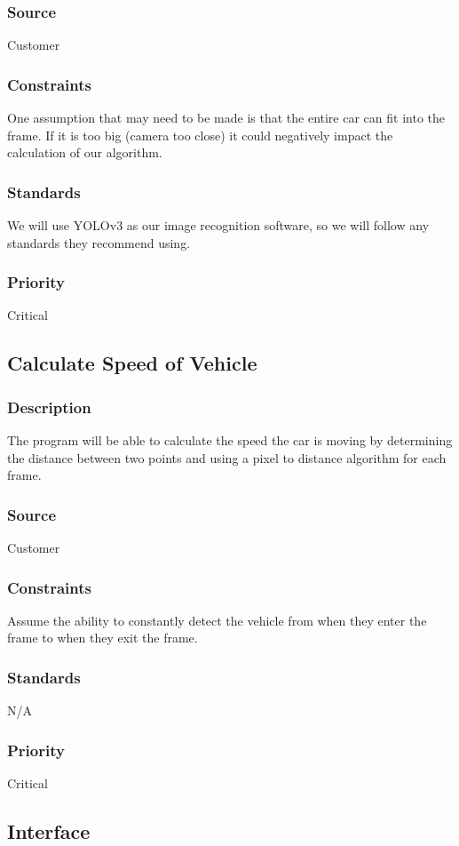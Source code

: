\subsubsection{Source}
Customer
\subsubsection{Constraints}
One assumption that may need to be made is that the entire car can fit into the frame. If it is too big (camera too close) it could negatively impact the calculation of our algorithm. 
\subsubsection{Standards}
We will use YOLOv3 as our image recognition software, so we will follow any standards they recommend using.
\subsubsection{Priority}
Critical

\subsection{Calculate Speed of Vehicle}
\subsubsection{Description}
The program will be able to calculate the speed the car is moving by determining the distance between two points and using a pixel to distance algorithm for each frame. 
\subsubsection{Source}
Customer
\subsubsection{Constraints}
Assume the ability to constantly detect the vehicle from when they enter the frame to when they exit the frame.
\subsubsection{Standards}
N/A
\subsubsection{Priority}
Critical

\subsection{Interface}

